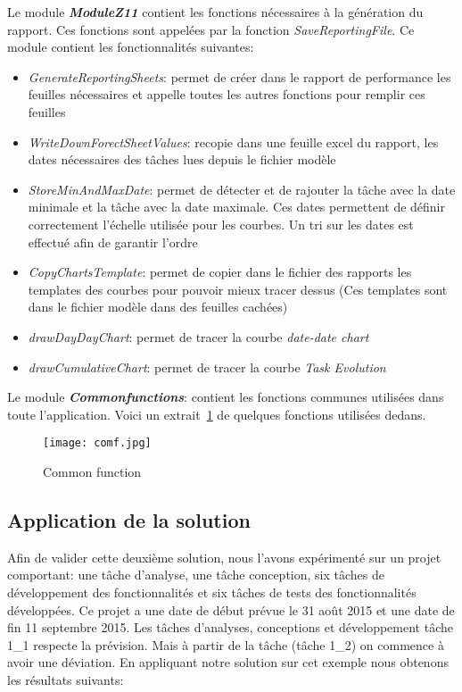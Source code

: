 Le module \textbf{\textit{ModuleZ11}} contient les fonctions nécessaires à la génération du rapport. Ces fonctions sont appelées par la fonction \textit{SaveReportingFile}. Ce module contient les fonctionnalités suivantes:
\begin{itemize}
\item \textit{GenerateReportingSheets}: permet de créer dans le rapport de performance les feuilles nécessaires et appelle toutes les autres fonctions pour remplir ces feuilles
\item \textit{WriteDownForectSheetValues}: recopie dans une feuille excel du rapport, les dates nécessaires des tâches lues depuis le fichier modèle
\item \textit{StoreMinAndMaxDate}: permet de détecter et de rajouter la tâche avec la date minimale et la tâche avec la date maximale. Ces dates permettent de définir correctement l'échelle utilisée pour les courbes. Un tri sur les dates est effectué afin de garantir l'ordre
\item \textit{CopyChartsTemplate}: permet de copier dans le fichier des rapports les templates des courbes pour pouvoir mieux tracer dessus (Ces templates sont dans le fichier modèle dans des feuilles cachées)
\item \textit{drawDayDayChart}: permet de tracer la courbe \textit{date-date chart}
\item \textit{drawCumulativeChart}: permet de tracer la courbe \textit{Task Evolution}
\end{itemize}
Le module \textbf{\textit{Commonfunctions}}: contient les fonctions communes utilisées dans toute l'application. Voici un extrait~\ref{comf} de quelques fonctions utilisées dedans.
\begin{figure}[h]
\centering
\texttt{[image: comf.jpg]}
\caption{\label{comf}Common function}
\end{figure}

\subsection{Application de la solution}
Afin de valider cette deuxième solution, nous l'avons expérimenté sur un projet comportant: une tâche d'analyse, une tâche conception, six tâches de développement des fonctionnalités et six tâches de tests des fonctionnalités développées.
Ce projet a une date de début prévue le 31 août 2015 et une date de fin 11 septembre 2015.
Les tâches d'analyses, conceptions et développement tâche 1\_1 respecte la prévision. Mais à partir de la tâche (tâche 1\_2) on commence à avoir une déviation. En appliquant notre solution sur cet exemple nous obtenons les résultats suivants:
